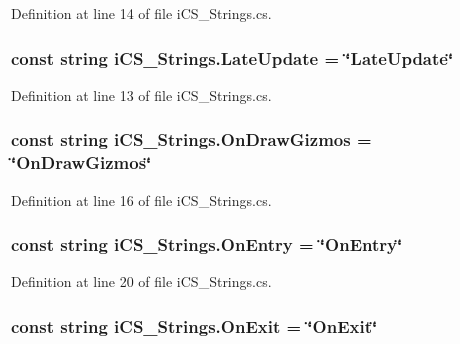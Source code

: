 Definition at line 14 of file i\+C\+S\+\_\+\+Strings.\+cs.

\hypertarget{classi_c_s___strings_a39c61a7a753d26767ef4252f4c246cd0}{
\subsubsection[{Late\+Update}]{\setlength{\rightskip}{0pt plus 5cm}const string i\+C\+S\+\_\+\+Strings.\+Late\+Update = \char`\"{}Late\+Update\char`\"{}}}\label{classi_c_s___strings_a39c61a7a753d26767ef4252f4c246cd0}


Definition at line 13 of file i\+C\+S\+\_\+\+Strings.\+cs.

\hypertarget{classi_c_s___strings_aa2f690070795b5a7068b636b60720427}{
\subsubsection[{On\+Draw\+Gizmos}]{\setlength{\rightskip}{0pt plus 5cm}const string i\+C\+S\+\_\+\+Strings.\+On\+Draw\+Gizmos = \char`\"{}On\+Draw\+Gizmos\char`\"{}}}\label{classi_c_s___strings_aa2f690070795b5a7068b636b60720427}


Definition at line 16 of file i\+C\+S\+\_\+\+Strings.\+cs.

\hypertarget{classi_c_s___strings_a2637e715ce2c4cd40cbe65f4eae17755}{
\subsubsection[{On\+Entry}]{\setlength{\rightskip}{0pt plus 5cm}const string i\+C\+S\+\_\+\+Strings.\+On\+Entry = \char`\"{}On\+Entry\char`\"{}}}\label{classi_c_s___strings_a2637e715ce2c4cd40cbe65f4eae17755}


Definition at line 20 of file i\+C\+S\+\_\+\+Strings.\+cs.

\hypertarget{classi_c_s___strings_ae97b5ddab4435c2867574b26256f873b}{
\subsubsection[{On\+Exit}]{\setlength{\rightskip}{0pt plus 5cm}const string i\+C\+S\+\_\+\+Strings.\+On\+Exit = \char`\"{}On\+Exit\char`\"{}}}\label{classi_c_s___strings_ae97b5ddab4435c2867574b26256f873b}


